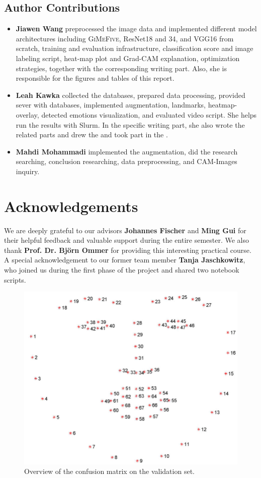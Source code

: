 \subsection*{Author Contributions}
\label{sec:author}

\begin{itemize}
  \item \textbf{Jiawen Wang} preprocessed the image data 
  and implemented different model architectures including \textsc{GiMeFive}, ResNet18 and 34, 
  and VGG16 from scratch, 
  training and evaluation infrastructure, classification score and image labeling script, 
  heat-map plot and Grad-CAM explanation, optimization strategies, 
  together with the corresponding writing part. 
  Also, she is responsible for the figures and tables of this report.
  \item \textbf{Leah Kawka} collected the databases, prepared data processing, provided sever with databases, 
  implemented augmentation, landmarks, heatmap-overlay, detected emotions visualization, 
  and evaluated video script. 
  She helps run the results with Slurm. 
  In the specific writing part, 
  she also wrote the related parts and drew the  and took part in the .
  \item \textbf{Mahdi Mohammadi} implemented the augmentation, did the research searching, conclusion researching, data preprocessing, and CAM-Images inquiry.
\end{itemize}

\section*{Acknowledgements}

We are deeply grateful to our advisors \textbf{Johannes Fischer} and \textbf{Ming Gui} for their helpful feedback and valuable support during the entire semester. 
We also thank \textbf{Prof. Dr. Björn Ommer} for providing this interesting practical course. 
A special acknowledgement to our former team member \textbf{Tanja Jaschkowitz}, 
who joined us during the first phase of the project and shared two notebook scripts.

\begin{figure}[ht]
  \centering
   \includegraphics[width=\linewidth]{visual.png}
   \caption{Overview of the confusion matrix on the validation set.} 
   \label{fig:visual}
\end{figure}

\newpage